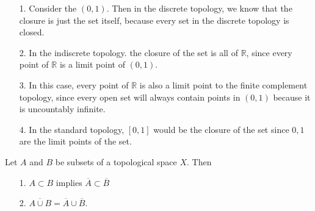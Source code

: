 \documentclass[letterpaper,12pt,twoside]{maths}
\begin{document}
\begin{solution}
    \begin{itemize}
        \item[1.]Consider the $(0,1)$. Then in the discrete topology, we know that
        the closure is just the set itself, because every set in the discrete
        topology is closed.
    
        \item[2.] In the indiscrete topology. the closure of the set is all of
        $\mathbb{R}$, since every point of $\mathbb{R}$ is a limit point of
        $(0,1)$.
    
        \item[3.] In this case, every point of $\mathbb{R}$ is also a limit point to
        the finite complement topology, since every open set will always
        contain points in $(0, 1)$ because it is uncountably infinite.
    
        \item[4.] In the standard topology, $[0,1]$ would be the closure of the set
        since $0, 1$ are the limit points of the set. 
        \end{itemize}
\end{solution}

\begin{problem}[Theorem 3.22.] Let $A$ and $B$ be subsets of a
    topological space $X$. Then
    \begin{itemize}
        \item[1.] $A \subset B$ implies $\overline{A} \subset \overline{B}$
        
        \item[2.] $\overline{A \cup B} = \overline{A} \cup \overline{B}.$
    \end{itemize}
\end{problem}
\end{document}
